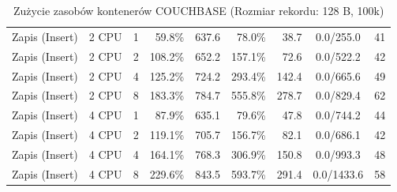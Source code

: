 \begin{table}[ht]
{\begin{tabular}{llcrrrrcc}
Zapis (Insert) & 2 CPU & 1 & 59.8\% & 637.6 & 78.0\% & 38.7 & 0.0/255.0 & 41 \\
Zapis (Insert) & 2 CPU & 2 & 108.2\% & 652.2 & 157.1\% & 72.6 & 0.0/522.2 & 42 \\
Zapis (Insert) & 2 CPU & 4 & 125.2\% & 724.2 & 293.4\% & 142.4 & 0.0/665.6 & 49 \\
Zapis (Insert) & 2 CPU & 8 & 183.3\% & 784.7 & 555.8\% & 278.7 & 0.0/829.4 & 62 \\
Zapis (Insert) & 4 CPU & 1 & 87.9\% & 635.1 & 79.6\% & 47.8 & 0.0/744.2 & 44 \\
Zapis (Insert) & 4 CPU & 2 & 119.1\% & 705.7 & 156.7\% & 82.1 & 0.0/686.1 & 42 \\
Zapis (Insert) & 4 CPU & 4 & 164.1\% & 768.3 & 306.9\% & 150.8 & 0.0/993.3 & 48 \\
Zapis (Insert) & 4 CPU & 8 & 229.6\% & 843.5 & 593.7\% & 291.4 & 0.0/1433.6 & 58 \\
\bottomrule
\end{tabular}%
}
\caption{Zużycie zasobów kontenerów COUCHBASE (Rozmiar rekordu: 128 B, 100k)}
\label{tab:resources_couchbase_small_100000}
\end{table}

